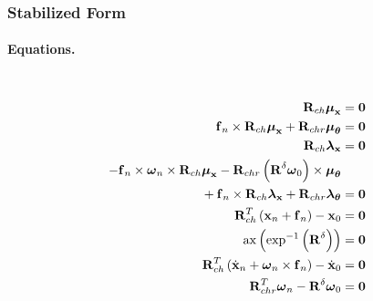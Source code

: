 \documentclass[10pt,dvips,fleqn,subeqn]{report}
\newcommand{\T}[1]{\bm{\mathbf{#1}}}
\newcommand{\TT}[1]{\bm{\mathbf{#1}}}
\begin{document}
\subsubsection{Stabilized Form}
\paragraph{Equations.} \
\begin{subequations}
\begin{align}
	\TT{R}_{ch} \T{\mu}_{\T{x}} &= \T{0} \\
%
	\T{f}_n \times \TT{R}_{ch} \T{\mu}_{\T{x}} + \TT{R}_{chr} \T{\mu}_{\T{\theta}} &= \T{0} \\
%
	\TT{R}_{ch} \T{\lambda}_{\T{x}} &= \T{0} \\
%
	-\T{f}_n \times \T{\omega}_n \times \TT{R}_{ch} \T{\mu}_{\T{x}}
	- \TT{R}_{chr} \plbr{\TT{R}^{\delta} \T{\omega}_0} \times \T{\mu}_{\T{\theta}} & \nonumber \\
	\mbox{} + \T{f}_n \times \TT{R}_{ch} \T{\lambda}_{\T{x}} + \TT{R}_{chr} \T{\lambda}_{\T{\theta}} &= \T{0} \\
%
	\TT{R}_{ch}^T\plbr{\T{x}_n + \T{f}_n} - \T{x}_0 &= \T{0} \\
%
	\mathrm{ax}\plbr{
		\mathrm{exp}^{-1}\plbr{
			\TT{R}^{\delta}
		}
	} &= \T{0} \\
%
	\TT{R}_{ch}^T\plbr{\dot{\T{x}}_n + \T{\omega}_n \times \T{f}_n} -\dot{\T{x}}_0 &= \T{0} \\
%
	\TT{R}_{chr}^T \T{\omega}_n - \TT{R}^{\delta} \T{\omega}_0 &= \T{0}
\end{align}
\end{subequations}
\end{document}
